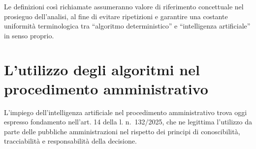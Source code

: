 \documentclass[american,a4paper,]{article}
\begin{document}
Le definizioni così richiamate assumeranno valore di riferimento concettuale nel prosieguo dell'analisi, al fine di evitare ripetizioni e garantire una costante uniformità terminologica tra ``algoritmo deterministico'' e ``intelligenza artificiale'' in senso proprio.

\section{L'utilizzo degli algoritmi nel procedimento amministrativo}\label{lutilizzo-degli-algoritmi-nel-procedimento-amministrativo}

L'impiego dell'intelligenza artificiale nel procedimento amministrativo trova oggi espresso fondamento nell'art. 14 della l. n.~132/2025, che ne legittima l'utilizzo da parte delle pubbliche amministrazioni nel rispetto dei principi di conoscibilità, tracciabilità e responsabilità della decisione.
\end{document}
